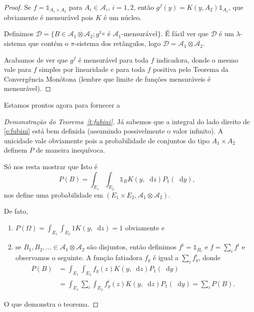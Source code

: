 \documentclass[reqno]{article}
\newcommand*\1{\mathds{1}}
\renewcommand*\d{\mathop{}\!\mathrm{d}}
\begin{document}
\begin{proof}
  Se $f = \1_{A_1 \times A_2}$ para $A_i \in \mathcal{A}_i$, $i = 1,2$, então $g^f(y) = K(y, A_2) \1_{A_1}$, que obviamente é mensurável pois $K$ é um núcleo.

  Definimos $\mathcal{D} = \{B \in \mathcal{A}_1 \otimes \mathcal{A}_2; g^{\1_B} \text{ é $\mathcal{A}_1$-mensurável}\}$.
  É fácil ver que $\mathcal{D}$ é um $\lambda$-sistema que contém o $\pi$-sistema dos retângulos, logo $\mathcal{D} = \mathcal{A}_1 \otimes \mathcal{A}_2$.

  Acabamos de ver que $g^f$ é mensurável para toda $f$ indicadora, donde o mesmo vale para $f$ simples por linearidade e para toda $f$ positiva pelo Teorema da Convergência Monótona (lembre que limite de funções mensuráveis é mensurável).
\end{proof}

Estamos prontos agora para fornecer a
\begin{proof}[Demonstração do Teorema~\ref{t:fubini}]
  Já sabemos que a integral do lado direito de \eqref{e:fubini} está bem definida (assumindo possivelmente o valor infinito).
  A unicidade vale obviamente pois a probabilidade de conjuntos do tipo $A_1 \times A_2$ definem $P$ de maneira inequívoca.


  Só nos resta mostrar que
  Isto é
  \begin{equation}
    P(B) = \int_{E_1} \int_{E_2} \1_{B} K(y, \d z) P_1 (\d y),
  \end{equation}
  nos define uma probabilidade em $(E_1 \times E_2, \mathcal{A}_1 \otimes \mathcal{A}_2)$.

  De fato,
  \begin{enumerate}[\quad a)]
  \item $P(\Omega) = \int_{E_1} \int_{E_2} 1 K(y, \d z) = 1$ obviamente e
  \item se $B_1, B_2, \dots \in \mathcal{A}_1 \otimes \mathcal{A}_2$ são disjuntos, então definimos $f^i = \1_{B_i}$ e $f = \sum_i f^i$ e observamos o seguinte.
    A função fatiadora $f_y$ é igual a $\sum_i f^i_y$, donde
    \begin{equation}
      \begin{split}
        P(B) & = \int_{E_1} \int_{E_2} f_y(z) K(y, \d z) P_1(\d y)\\
        & = \int_{E_1} \sum_i \int_{E_2} f^i_y(z) K(y, \d z) P_1(\d y) = \sum_i P(B).
      \end{split}
    \end{equation}
  \end{enumerate}
  O que demonstra o teorema.
\end{proof}
\end{document}
